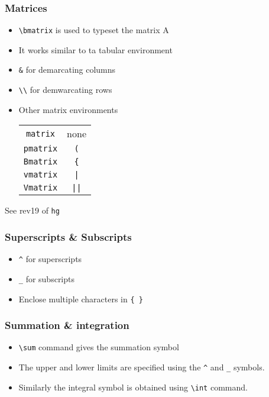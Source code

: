 \documentclass{beamer}
\newcommand{\typ}[1]{\lstinline{#1}}
\begin{document}
\begin{frame}[fragile]
  \frametitle{Matrices}
  \begin{itemize}
  \item \lstinline+\bmatrix+ is used to typeset the matrix A
  \item It works similar to ta tabular environment
  \item \lstinline+&+ for demarcating columns
  \item \lstinline+\\+ for demwarcating rows
  \item Other matrix environments
  \begin{table}
    \center
    \begin{tabular}{c|c}
      \lstinline+matrix+  &  none\\
      \lstinline+pmatrix+ &  \lstinline+(+\\
      \lstinline+Bmatrix+ &  \lstinline+{+\\
        \lstinline+vmatrix+ &  \lstinline+|+\\  
        \lstinline+Vmatrix+ &  \lstinline+||+
    \end{tabular}
  \end{table}
  \end{itemize}
  \tiny See rev19 of \typ{hg}    
\end{frame}

\begin{frame}[fragile]
  \frametitle{Superscripts \& Subscripts}
  \begin{itemize}
  \item \lstinline+^+ for superscripts
  \item \lstinline+_+ for subscripts
  \item Enclose multiple characters in \lstinline+{ }+
  \end{itemize}
\end{frame}

\begin{frame}[fragile]
  \frametitle{Summation \& integration}
  \begin{itemize}
  \item \lstinline+\sum+ command gives the summation symbol
  \item The upper and lower limits are specified using the
    \lstinline+^+ and \lstinline+_+ symbols. 
  \item Similarly the integral symbol is obtained using
    \lstinline+\int+ command. 
  \end{itemize}
\end{frame}
\end{document}
